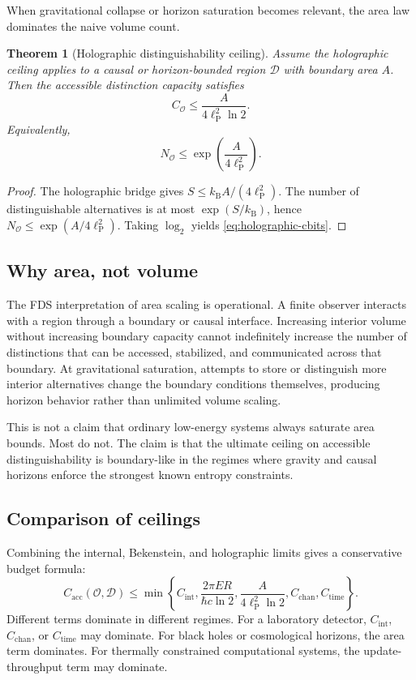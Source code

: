 \documentclass[10pt,a4paper,twocolumn,aps,prl]{revtex4-2}
\newtheorem{theorem}{Theorem}
\newcommand{\Obs}{\mathcal{O}}
\newcommand{\Patch}{\mathcal{D}}
\newcommand{\ellP}{\ell_{\mathrm P}}
\newcommand{\kB}{k_{\mathrm B}}
\newcommand{\NA}{N_{\Obs}}
\newcommand{\CA}{C_{\Obs}}
\begin{document}
When gravitational collapse or horizon saturation becomes relevant, the area law dominates the naive volume count.

\begin{theorem}[Holographic distinguishability ceiling]
Assume the holographic ceiling applies to a causal or horizon-bounded region $\Patch$ with boundary area $A$. Then the accessible distinction capacity satisfies
\begin{equation}
\CA\leq \frac{A}{4\ellP^2\ln2}.
\label{eq:holographic-cbits}
\end{equation}
Equivalently,
\begin{equation}
\NA\leq \exp\left(\frac{A}{4\ellP^2}\right).
\end{equation}
\end{theorem}

\begin{proof}
The holographic bridge gives $S\leq \kB A/(4\ellP^2)$. The number of distinguishable alternatives is at most $\exp(S/\kB)$, hence $\NA\leq\exp(A/4\ellP^2)$. Taking $\log_2$ yields \eqref{eq:holographic-cbits}.
\end{proof}

\subsection{Why area, not volume}

The FDS interpretation of area scaling is operational. A finite observer interacts with a region through a boundary or causal interface. Increasing interior volume without increasing boundary capacity cannot indefinitely increase the number of distinctions that can be accessed, stabilized, and communicated across that boundary. At gravitational saturation, attempts to store or distinguish more interior alternatives change the boundary conditions themselves, producing horizon behavior rather than unlimited volume scaling.

This is not a claim that ordinary low-energy systems always saturate area bounds. Most do not. The claim is that the ultimate ceiling on accessible distinguishability is boundary-like in the regimes where gravity and causal horizons enforce the strongest known entropy constraints.

\subsection{Comparison of ceilings}

Combining the internal, Bekenstein, and holographic limits gives a conservative budget formula:
\begin{equation}
C_{\mathrm{acc}}(\Obs,\Patch)
\leq
\min\left\{
C_{\mathrm{int}},
\frac{2\pi ER}{\hbar c\ln2},
\frac{A}{4\ellP^2\ln2},
C_{\mathrm{chan}},
C_{\mathrm{time}}
\right\}.
\label{eq:master-budget}
\end{equation}
Different terms dominate in different regimes. For a laboratory detector, $C_{\mathrm{int}}$, $C_{\mathrm{chan}}$, or $C_{\mathrm{time}}$ may dominate. For black holes or cosmological horizons, the area term dominates. For thermally constrained computational systems, the update-throughput term may dominate.
\end{document}
